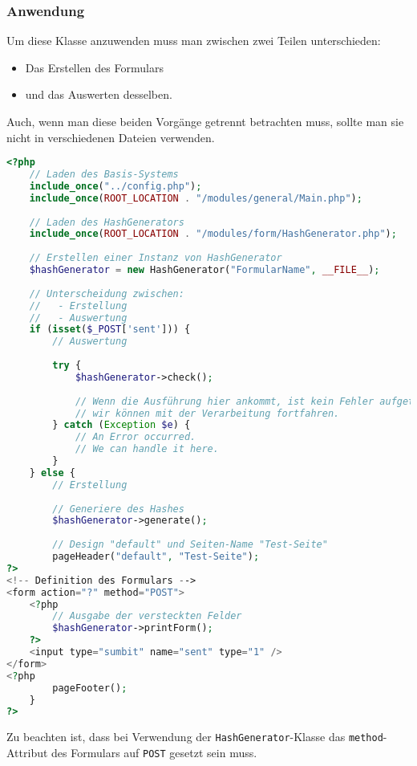 \subsubsection{Anwendung}
Um diese Klasse anzuwenden muss man zwischen zwei Teilen unterschieden:
\begin{itemize}
	\item Das Erstellen des Formulars
	\item und das Auswerten desselben.
\end{itemize}
Auch, wenn man diese beiden Vorgänge getrennt betrachten muss, sollte man sie nicht in verschiedenen Dateien verwenden.
\begin{lstlisting}[style=custom, language=php, caption={Anwendung von \texttt{HashGenerator}},label={lst:content_imple_hash_example}]
<?php
	// Laden des Basis-Systems
	include_once("../config.php");
	include_once(ROOT_LOCATION . "/modules/general/Main.php");
	
	// Laden des HashGenerators
	include_once(ROOT_LOCATION . "/modules/form/HashGenerator.php");
	
	// Erstellen einer Instanz von HashGenerator
	$hashGenerator = new HashGenerator("FormularName", __FILE__);
	
	// Unterscheidung zwischen:
	//   - Erstellung
	//   - Auswertung
	if (isset($_POST['sent'])) {
		// Auswertung
		
		try {
			$hashGenerator->check();
			
			// Wenn die Ausführung hier ankommt, ist kein Fehler aufgetreten,
			// wir können mit der Verarbeitung fortfahren.
		} catch (Exception $e) {
			// An Error occurred.
			// We can handle it here.
		}
	} else {
		// Erstellung
		
		// Generiere des Hashes
		$hashGenerator->generate();
		
		// Design "default" und Seiten-Name "Test-Seite"
		pageHeader("default", "Test-Seite");
?>
<!-- Definition des Formulars -->
<form action="?" method="POST">
	<?php
		// Ausgabe der versteckten Felder
		$hashGenerator->printForm();
	?>
	<input type="sumbit" name="sent" type="1" />
</form>
<?php
		pageFooter();
	}
?>
\end{lstlisting}
Zu beachten ist, dass bei Verwendung der \texttt{HashGenerator}-Klasse das \texttt{method}-Attribut des Formulars auf \texttt{POST} gesetzt sein muss.